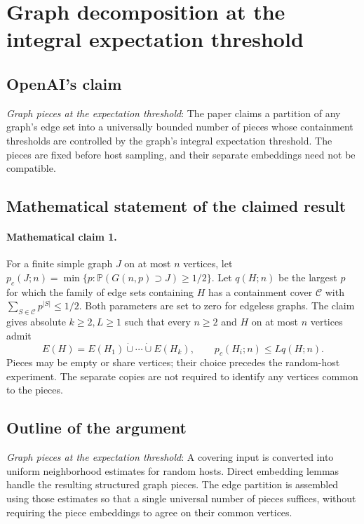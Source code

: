 \documentclass[11pt]{article}
\begin{document}
\section*{Graph decomposition at the integral expectation threshold}

\subsection{OpenAI's claim}
\textit{Graph pieces at the expectation threshold}: The paper claims a partition of any graph’s edge set into a universally bounded number of pieces whose containment thresholds are controlled by the graph’s integral expectation threshold. The pieces are fixed before host sampling, and their separate embeddings need not be compatible.

\subsection{Mathematical statement of the claimed result}
\paragraph{Mathematical claim 1.} For a finite simple graph $J$ on at most $n$ vertices, let $p_c(J;n)=\min\{p:\mathbb P(G(n,p)\supset J)\ge1/2\}$. Let $q(H;n)$ be the largest $p$ for which the family of edge sets containing $H$ has a containment cover $\mathcal C$ with $\sum_{S\in\mathcal C}p^{|S|}\le1/2$. Both parameters are set to zero for edgeless graphs. The claim gives absolute $k\ge2,L\ge1$ such that every $n\ge2$ and $H$ on at most $n$ vertices admit \[E(H)=E(H_1)\mathbin{\dot\cup}\cdots\mathbin{\dot\cup}E(H_k),\qquad p_c(H_i;n)\le Lq(H;n).\] Pieces may be empty or share vertices; their choice precedes the random-host experiment. The separate copies are not required to identify any vertices common to the pieces.

\subsection{Outline of the argument}
\textit{Graph pieces at the expectation threshold}: A covering input is converted into uniform neighborhood estimates for random hosts. Direct embedding lemmas handle the resulting structured graph pieces. The edge partition is assembled using those estimates so that a single universal number of pieces suffices, without requiring the piece embeddings to agree on their common vertices.
\end{document}
